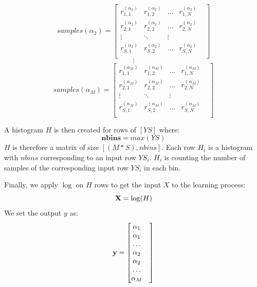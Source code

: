 \documentclass[a4paper, 12pt]{report}
\begin{document}
\[
samples(\alpha_2) = \begin{bmatrix} 
    r^{(\alpha_2)}_{1,1} & r^{(\alpha_2)}_{1,2} & \dots & r^{(\alpha_2)}_{1,N} & \\
    r^{(\alpha_2)}_{2,1} & r^{(\alpha_2)}_{2,2} & \dots & r^{(\alpha_2)}_{2,N} & \\
    \vdots & \ddots & \vdots & \\
    r^{(\alpha_2)}_{S,1} & r^{(\alpha_2)}_{S,2} & \dots & r^{(\alpha_2)}_{S,N} & \\
\end{bmatrix}
\]
\[
\vdots
\]
\[
samples(\alpha_M) = \begin{bmatrix} 
    r^{(\alpha_M)}_{1,1} & r^{(\alpha_M)}_{1,2} & \dots & r^{(\alpha_M)}_{1,N} & \\
    r^{(\alpha_M)}_{2,1} & r^{(\alpha_M)}_{2,2} & \dots & r^{(\alpha_M)}_{2,N} & \\
    \vdots & \ddots & \vdots & \\
    r^{(\alpha_M)}_{S,1} & r^{(\alpha_M)}_{S,2} & \dots & r^{(\alpha_M)}_{S,N} & \\
\end{bmatrix}
\]

A histogram $H$ is then created for rows of $[YS]$ where: 
\begin{equation}
\label{eq:nbins}
\textbf {nbins} = max(YS)
\end{equation}
$H$ is therefore a matrix of size $[(M * S), nbins]$.  Each row $H_i$ is a histogram with $nbins$ corresponding to an input row $YS_i$. $H_i$ is counting the number of samples of the corresponding input row $YS_i$ in each bin.

Finally, we apply $\log$ on $H$ rows to get the input $X$ to the learning process:
\begin{equation}
\label{eq:log_H}
    {\textbf X} = \log(H)
\end{equation}
We set the output $y$ as:
\begin{equation}
\label{eq:y}
{\textbf y} = \begin{bmatrix} 
    \alpha_1 & \\
    \alpha_1 & \\
    \hdots & \\
    \alpha_2 & \\
    \alpha_2 & \\
    \hdots & \\
    \alpha_M & \\
\end{bmatrix}
\end{equation}
\end{document}
